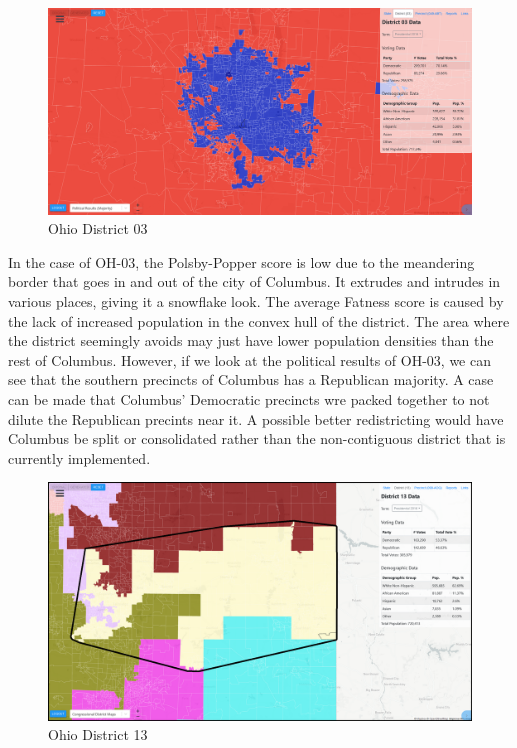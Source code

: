 \documentclass[letterpaper]{article}
\begin{document}
\begin{figure}[H]
	\includegraphics[width=\linewidth]{./figures/OH-03-PoliticalResults.png}
	\caption{Ohio District 03}
	\label{fig:oh03pr}
\end{figure}

In the case of OH-03, the Polsby-Popper score is low due to the meandering border that goes in and out of the city of Columbus. It extrudes and intrudes in various places, giving it a snowflake look. The average Fatness score is caused by the lack of increased population in the convex hull of the district. The area where the district seemingly avoids may just have lower population densities than the rest of Columbus. However, if we look at the political results of OH-03, we can see that the southern precincts of Columbus has a Republican majority. A case can be made that Columbus' Democratic precincts wre packed together to not dilute the Republican precints near it. A possible better redistricting would have Columbus be split or consolidated rather than the non-contiguous district that is currently implemented.

\begin{figure}[H]
	\includegraphics[width=\linewidth]{./figures/OH-13-ConvexHull.png}
	\caption{Ohio District 13}
	\label{fig:oh13ch}
\end{figure}
\end{document}
